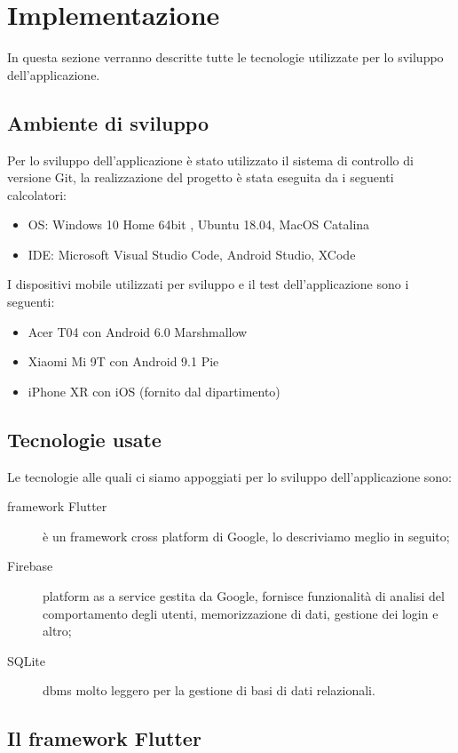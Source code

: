 \chapter{Implementazione\label{sec:implementazione}}
In questa sezione verranno descritte tutte le tecnologie utilizzate per lo sviluppo dell'applicazione.
\section{Ambiente di sviluppo\label{sec:ambiente}}
Per lo sviluppo dell'applicazione è stato utilizzato il sistema di controllo di versione Git,  la realizzazione del progetto è stata eseguita da i seguenti calcolatori:
\begin{itemize}
	\item OS: Windows 10 Home 64bit , Ubuntu 18.04, MacOS Catalina
	\item IDE: Microsoft Visual Studio Code, Android Studio, XCode
\end{itemize}

I dispositivi mobile utilizzati per sviluppo e il test dell'applicazione sono i seguenti:
\begin{itemize}
    \item Acer T04 con Android 6.0 Marshmallow
    \item Xiaomi Mi 9T con Android 9.1 Pie
    \item iPhone XR con iOS (fornito dal dipartimento)
\end{itemize}

\section{Tecnologie usate\label{sec:tecnologie}}
Le tecnologie alle quali ci siamo appoggiati per lo sviluppo dell'applicazione sono:
\begin{description}
    \item[framework Flutter] è un framework cross platform di Google, lo descriviamo meglio in seguito;
    \item[Firebase] platform as a service gestita da Google, fornisce funzionalità di analisi del comportamento degli utenti, memorizzazione di dati, gestione dei login e altro;
    \item[SQLite] dbms molto leggero per la gestione di basi di dati relazionali.   
\end{description}


\section{Il framework Flutter\label{sec:flutter}}
